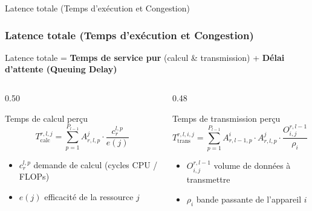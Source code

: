 \documentclass[10pt,aspectratio=169]{beamer}
\begin{document}
\begin{frame}{Latence totale (Temps d'exécution et Congestion)}
\frametitle{Latence totale (Temps d'exécution et Congestion)}

Latence totale = \textbf{Temps de service pur} (calcul \& transmission) + \alert{\textbf{Délai d'attente (Queuing Delay)}}

\bigskip

\begin{columns}[T]  %
\begin{column}{0.50\textwidth}

\begin{block}{Temps de calcul perçu}
\[
T_{\text{calc}}^{r,l,j} = \sum_{p=1}^{P_{l-1}} A^j_{r,l,p} \cdot \frac{c^{l,p}_r}{e(j)}
\]
\end{block}

\begin{itemize}
\item $c^{l,p}_r$ \quad demande de calcul (cycles CPU / FLOPs)
\item $e(j)$ \quad efficacité de la ressource $j$
\end{itemize}

\end{column}

\begin{column}{0.48\textwidth}

\begin{block}{Temps de transmission perçu}
\[
T_{\text{trans}}^{r,l,i,j} = \sum_{p=1}^{P_{l-1}} A^i_{r,{l-1},p} \cdot A^j_{r,l,p} \cdot \frac{O^{r,l-1}_{i,j}}{\rho_i} \cdot \mathbf{1}_{i \neq j}
\]
\end{block}

\begin{itemize}
\item $O^{r,l-1}_{i,j}$ \quad volume de données à transmettre
\item $\rho_i$ \quad bande passante de l'appareil $i$
\end{itemize}

\end{column}
\end{columns}

\end{frame}
\end{document}
